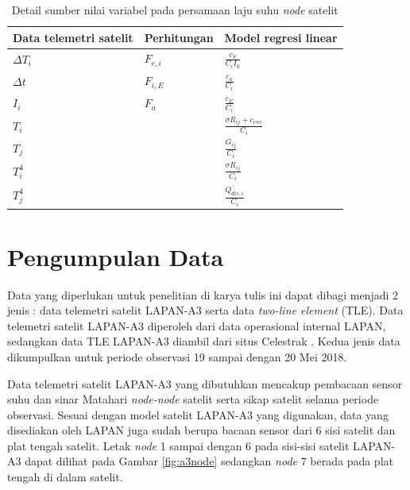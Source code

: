 \begin{table}[!ht]
\begin{center}
	\caption{Detail sumber nilai variabel pada persamaan laju suhu \textit{node} satelit}
\label{table:variabellist}
\begin{tabular}{|l|l|l|}
\hline
Data telemetri satelit & Perhitungan & Model regresi linear                  \\ \hline
$\Delta T_{i}$         & $F_{e,i}$   & $\frac{c_S}{C_iI_0}$                  \\ \hline
$\Delta t$             & $F_{i,E}$   & $\frac{c_a}{C_i}$                     \\ \hline
$I_i$                  & $F_{a}$     & $\frac{c_E}{C_i}$                     \\ \hline
$T_i$                  &             & $\frac{\sigma R_{ij} + c_{env}}{C_i}$ \\ \hline
$T_j$                  &             & $\frac{G_{ij}}{C_i}$                  \\ \hline
$T_i^4$             &             & $\frac{\sigma R_{ij}}{C_i}$           \\ \hline
$T_j^4$             &             & $\frac{\dot{Q_{dis,i}}}{C_i}$         \\ \hline
\end{tabular}
\end{center}
\vspace{-5mm}
\end{table}


\section{Pengumpulan Data}

Data yang diperlukan untuk penelitian di karya tulis ini dapat dibagi menjadi 2 jenis : data
telemetri satelit LAPAN-A3 serta data \textit{two-line element} (TLE). Data
telemetri satelit LAPAN-A3 diperoleh dari data operasional internal LAPAN,
sedangkan data TLE LAPAN-A3 diambil dari situs Celestrak \cite{kelso}. Kedua
jenis data dikumpulkan untuk periode observasi 19 sampai dengan 20 Mei 2018.

Data telemetri satelit LAPAN-A3 yang dibutuhkan mencakup pembacaan sensor suhu
dan sinar Matahari \textit{node-node} satelit serta sikap satelit selama
periode observasi. Sesuai dengan model satelit LAPAN-A3 yang digunakan, data
yang disediakan oleh LAPAN juga sudah berupa bacaan sensor dari 6 sisi satelit
dan plat tengah satelit. Letak \textit{node} 1 sampai dengan 6 pada sisi-sisi
satelit LAPAN-A3 dapat dilihat pada Gambar \ref{fig:a3node} sedangkan
\textit{node} 7 berada pada plat tengah di dalam satelit.

